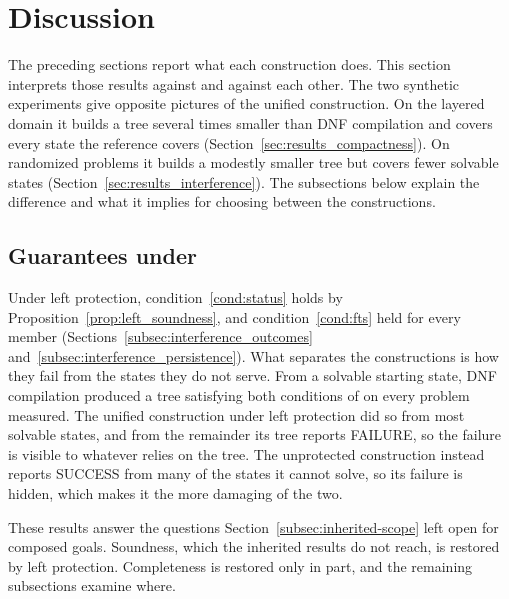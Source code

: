 \section{Discussion}
\label{sec:results_discussion}
    The preceding sections report what each construction does.
    This section interprets those results against \probprime and against each other.
    The two synthetic experiments give opposite pictures of the unified construction.
    On the layered domain it builds a tree several times smaller than DNF compilation and covers every state the reference covers (Section~\ref{sec:results_compactness}).
    On randomized problems it builds a modestly smaller tree but covers fewer solvable states (Section~\ref{sec:results_interference}).
    The subsections below explain the difference and what it implies for choosing between the constructions.

    \subsection{Guarantees under \probprime}
    \label{subsec:discussion_guarantees}
    Under left protection, condition~\ref{cond:status} holds by Proposition~\ref{prop:left_soundness}, and condition~\ref{cond:fts} held for every member (Sections~\ref{subsec:interference_outcomes} and~\ref{subsec:interference_persistence}).
    What separates the constructions is how they fail from the states they do not serve.
    From a solvable starting state, DNF compilation produced a tree satisfying both conditions of \probprime on every problem measured.
    The unified construction under left protection did so from most solvable states, and from the remainder its tree reports FAILURE, so the failure is visible to whatever relies on the tree.
    The unprotected construction instead reports SUCCESS from many of the states it cannot solve, so its failure is hidden, which makes it the more damaging of the two.

    These results answer the questions Section~\ref{subsec:inherited-scope} left open for composed goals.
    Soundness, which the inherited results do not reach, is restored by left protection.
    Completeness is restored only in part, and the remaining subsections examine where.

